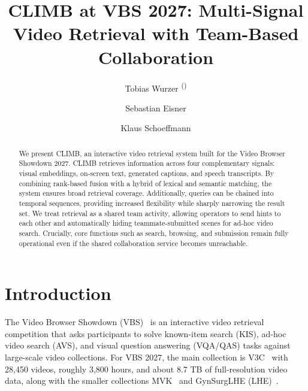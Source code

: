 \documentclass{llncs}
\begin{document}
\title{CLIMB at VBS 2027: Multi-Signal Video Retrieval with Team-Based Collaboration}
\author{
    Tobias Wurzer \textsuperscript{()}  \and
    Sebastian Eisner   \and
    Klaus Schoeffmann  
}


\maketitle



\begin{abstract}
We present CLIMB, an interactive video retrieval system built for the Video Browser Showdown 2027.
CLIMB retrieves information across four complementary signals: 
visual embeddings, on-screen text, generated captions, and speech transcripts.
By combining rank-based fusion with a hybrid of lexical and semantic matching, the system ensures broad retrieval coverage.
Additionally, queries can be chained into temporal sequences, providing increased flexibility while sharply narrowing the result set.
We treat retrieval as a shared team activity, allowing operators to send hints to each other and automatically hiding teammate-submitted scenes for ad-hoc video search.
Crucially, core functions such as search, browsing, and submission remain fully operational even if the shared collaboration service becomes unreachable.

\end{abstract}


\section{Introduction}
The Video Browser Showdown (VBS)~\cite{vbsoverview,lokovc2023interactive,Lokoc2018} is an interactive video retrieval competition that asks participants 
to solve known-item search (KIS), ad-hoc video search (AVS), and visual question answering (VQA/QAS) tasks 
against large-scale video collections. For VBS 2027, the main collection is V3C~\cite{v3c} with 28{,}450 videos, 
roughly 3{,}800 hours, and about 8.7 TB of full-resolution video data,
along with the smaller collections MVK~\cite{mvk} and GynSurgLHE (LHE)~\cite{GynSurgLHE}.
\end{document}

